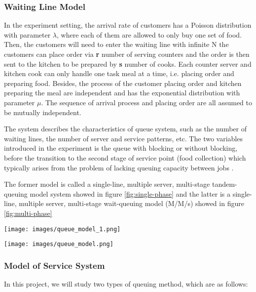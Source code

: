 \subsubsection{Waiting Line Model}
In the experiment setting, the arrival rate of customers has a Poisson distribution with parameter $\lambda$, where each of them are allowed to only buy one set of food. Then, the customers will need to enter the waiting line with infinite N the customers can place order via \textbf{r} number of serving counters and the order is then sent to the kitchen to be prepared by \textbf{s} number of cooks. Each counter server and kitchen cook can only handle one task meal at a time, i.e. placing order and preparing food. Besides, the process of the customer placing order and kitchen preparing the meal are independent and has the exponential distribution with parameter $\mu$. The sequence of arrival process and placing order are all assumed to be mutually independent.

The system describes the characteristics of queue system, such as the number of waiting lines, the number of server and service patterns, etc. The two variables introduced in the experiment is the queue with blocking or without blocking, before the transition to the second stage of service point (food collection) which typically arises from the problem of lacking queuing capacity between jobs \cite{Gomez-Corral2002}.
 
The former model is called a single-line, multiple server, multi-stage tandem-queuing model \cite{ross2014introduction} system showed in figure \ref{fig:single-phase}  and the latter is a single-line, multiple server, multi-stage wait-queuing model (M/M/s) \cite{WU2019927} showed in figure \ref{fig:multi-phase}

\noindent
\begin{minipage}{\textwidth}
    \texttt{[image: images/queue\_model\_1.png]}
    \label{fig:single-phase}
\end{minipage}
\begin{minipage}{\textwidth}
    \texttt{[image: images/queue\_model.png]}
    \label{fig:multi-phase}
\end{minipage}
\subsubsection{Model of Service System}
In this project, we will study two types of queuing method, which are as follows:

